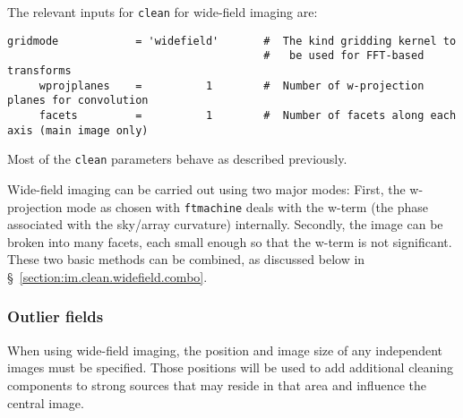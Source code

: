 %
%

The relevant inputs for {\tt clean} for wide-field imaging are:
\small
\begin{verbatim}
gridmode            = 'widefield'       #  The kind gridding kernel to
                                        #   be used for FFT-based transforms
     wprojplanes    =          1        #  Number of w-projection planes for convolution
     facets         =          1        #  Number of facets along each axis (main image only)
\end{verbatim}
\normalsize
Most of the {\tt clean} parameters behave as described previously.

Wide-field imaging can be carried out using two major modes: First, the
w-projection mode as chosen with {\tt ftmachine} deals with the w-term
(the phase associated with the sky/array curvature) internally.  Secondly, the image can be
broken into many facets, each small enough so that the w-term is not
significant.  These two basic methods can be combined, as discussed
below in \S~\ref{section:im.clean.widefield.combo}.

\subsubsection{Outlier fields}
\label{section:im.clean.widefield.outliers}

When using wide-field imaging, the position and image size of any
independent images must be specified. Those positions will be used to
add additional cleaning components to strong sources that may reside
in that area and influence the central image.

